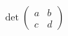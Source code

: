 \documentclass[preview]{standalone}
\begin{document}
\begin{align*}
\det\begin{pmatrix} a & b \\ c & d \end{pmatrix}
\end{align*}
\end{document}
